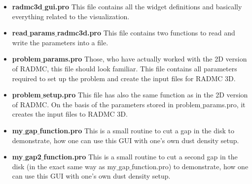 \documentclass{report}
\begin{document}
\begin{itemize}
\item {\bf radmc3d$\_$gui.pro} This file contains all the widget definitions and basically everything related
to the visualization. 
\item {\bf read$\_$params$\_$radmc3d.pro} This file contains two functions to read and write the parameters
into a file. 
\item {\bf problem$\_$params.pro} Those, who have actually worked with the 2D version of RADMC, this file
should look familiar. This file contains all parameters required to set up the problem and create the input
files for RADMC 3D. 
\item {\bf problem$\_$setup.pro} This file has also the same function as in the 2D version of RADMC. On
the basis of the parameters stored in problem$\_$params.pro, it creates the input files to RADMC 3D. 
\item {\bf my$\_$gap$\_$function.pro} This is a small routine to cut a gap in the disk to demonstrate, how
one can use this GUI with one's own dust density setup. 
\item {\bf my$\_$gap2$\_$function.pro} This is a small routine to cut a second gap in the disk 
(in the exact same way as my$\_$gap$\_$function.pro) to demonstrate, how
one can use this GUI with one's own dust density setup. 
\end{itemize}
\end{document}
